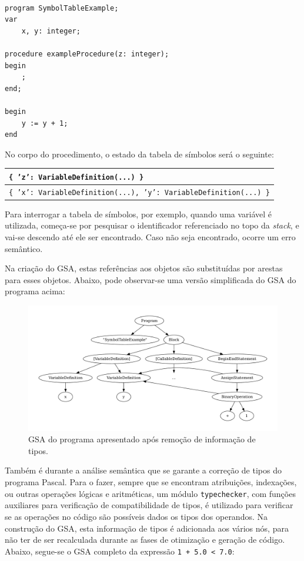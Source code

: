 \documentclass[12pt, a4paper]{article}
\begin{document}
\lstset{
    language=pascal
}

\begin{lstlisting}

program SymbolTableExample;
var
    x, y: integer;

procedure exampleProcedure(z: integer);
begin
    ;
end;

begin
    y := y + 1;
end
\end{lstlisting}

No corpo do procedimento, o estado da tabela de símbolos será o seguinte:

\begin{tabular}{|>{\centering\arraybackslash}p{\textwidth}|}
    \hline
    \texttt{\{ 'z': VariableDefinition(...) \}} \\
    \hline
    \texttt{\{ 'x': VariableDefinition(...), 'y': VariableDefinition(...) \}} \\
    \hline
\end{tabular}

Para interrogar a tabela de símbolos, por exemplo, quando uma variável é utilizada, começa-se por
pesquisar o identificador referenciado no topo da \emph{stack}, e vai-se descendo até ele ser
encontrado. Caso não seja encontrado, ocorre um erro semântico.

Na criação do GSA, estas referências aos objetos são substituídas por arestas para esses objetos.
Abaixo, pode observar-se uma versão simplificada do GSA do programa acima:

\begin{figure}[H]
    \centering
    \includegraphics[width=\textwidth]{res/variable-reference.pdf}
    \caption{GSA do programa apresentado após remoção de informação de tipos.}
\end{figure}

Também é durante a análise semântica que se garante a correção de tipos do programa Pascal. Para o
fazer, sempre que se encontram atribuições, indexações, ou outras operações lógicas e aritméticas,
um módulo \texttt{typechecker}, com funções auxiliares para verificação de compatibilidade de tipos,
é utilizado para verificar se as operações no código são possíveis dados os tipos dos operandos.
Na construção do GSA, esta informação de tipos é adicionada aos vários nós, para não ter de ser
recalculada durante as fases de otimização e geração de código. Abaixo, segue-se o GSA completo da
expressão \texttt{1 + 5.0 < 7.0}:
\end{document}
